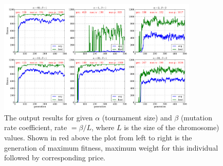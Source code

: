 \begin{figure}[H]
  \centering
		\includegraphics[width=0.85\textwidth]{images/out.png}
  \caption{\scriptsize The output results for given $\alpha$ (tournament size) and $\beta$ (mutation rate coefficient, rate $= \beta / L$, where $L$ is the size of the chromosome) values.  Shown in red above the plot from left to right is the generation of maximum fitness, maximum weight for this individual followed by corresponding price.}
\end{figure}







